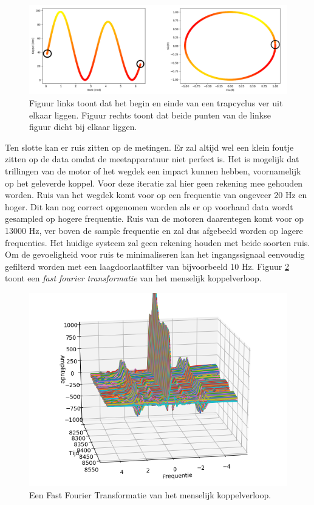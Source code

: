 \begin{figure}[h]
  \centering
  \includegraphics[width=\linewidth]{images/preprocessing-hoek.png}
  \caption{Figuur links toont dat het begin en einde van een trapcyclus ver uit elkaar liggen. Figuur rechts toont dat beide punten van de linkse figuur dicht bij elkaar liggen.}
  \label{fig:preprocessing hoek trapas}
\end{figure}

\noindent Ten slotte kan er ruis zitten op de metingen. Er zal altijd wel een klein foutje zitten op de data omdat de meetapparatuur niet perfect is. Het is mogelijk dat trillingen van de motor of het wegdek een impact kunnen hebben, voornamelijk op het geleverde koppel. Voor deze iteratie zal hier geen rekening mee gehouden worden. Ruis van het wegdek komt voor op een frequentie van ongeveer 20 Hz en hoger. Dit kan nog correct opgenomen worden als er op voorhand data wordt gesampled op hogere frequentie. Ruis van de motoren daarentegen komt voor op 13000 Hz, ver boven de sample frequentie en zal dus afgebeeld worden op lagere frequenties. Het huidige systeem zal geen rekening houden met beide soorten ruis. Om de gevoeligheid voor ruis te minimaliseren kan het ingangssignaal eenvoudig gefilterd worden met een laagdoorlaatfilter van bijvoorbeeld 10 Hz. Figuur \ref{fig:fft fietser} toont een \textit{fast fourier transformatie} van het menselijk koppelverloop.

\begin{figure}[h]
  \centering
  \includegraphics[width=\linewidth]{images/fft_fietser.png}
  \caption{Een Fast Fourier Transformatie van het menselijk koppelverloop.}
  \label{fig:fft fietser}
\end{figure}

